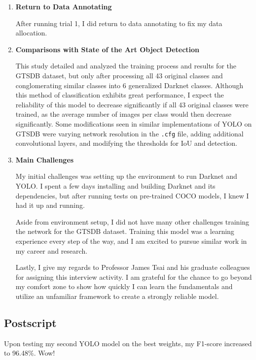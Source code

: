 \documentclass{article}
\begin{document}
\begin{enumerate}
            \item \textbf{Return to Data Annotating}
            
            After running trial 1, I did return to data annotating to fix my data allocation. 
            
            \item \textbf{Comparisons with State of the Art Object Detection}
            
            This study detailed and analyzed the training process and results for the GTSDB dataset, but only after processing all 43 original classes and conglomerating similar classes into 6 generalized Darknet classes. Although this method of classification exhibits great performance, I expect the reliability of this model to decrease significantly if all 43 original classes were trained, as the average number of images per class would then decrease significantly. Some modifications seen in similar implementations of YOLO on GTSDB were varying network resolution in the \texttt{.cfg} file, adding additional convolutional layers, and modifying the thresholds for IoU and detection. 
            
            \item \textbf{Main Challenges}
            
            My initial challenges was setting up the environment to run Darknet and YOLO. I spent a few days installing and building Darknet and its dependencies, but after running tests on pre-trained COCO models, I knew I had it up and running.
            
            Aside from environment setup, I did not have many other challenges training the network for the GTSDB dataset. Training this model was a learning experience every step of the way, and I am excited to pursue similar work in my career and research. 
            
            Lastly, I give my regards to Professor James Tsai and his graduate colleagues for assigning this interview activity. I am grateful for the chance to go beyond my comfort zone to show how quickly I can learn the fundamentals and utilize an unfamiliar framework to create a strongly reliable model.
            
        \end{enumerate}
    
        \subsection{Postscript}
        
        Upon testing my second YOLO model on the best weights, my F1-score increased to 96.48\%. Wow!


    \pagebreak
    
    
    
    
    
\end{document}

